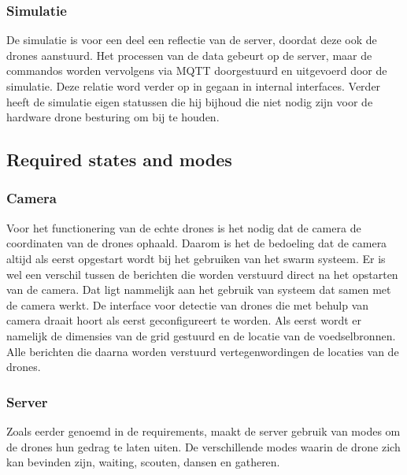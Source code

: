 \subsubsection*{Simulatie}
De simulatie is voor een deel een reflectie van de server, doordat deze ook de drones aanstuurd. Het processen van de data gebeurt op de server,
maar de commandos worden vervolgens via MQTT doorgestuurd en uitgevoerd door de simulatie. Deze relatie word verder op in gegaan in internal interfaces.
Verder heeft de simulatie eigen statussen die hij bijhoud die niet nodig zijn voor de hardware drone besturing om bij te houden. 
 



\subsection{Required states and modes}

\subsubsection*{Camera}
Voor het functionering van de echte drones is het nodig dat de camera de coordinaten van de drones ophaald. Daarom is het
de bedoeling dat de camera altijd als eerst opgestart wordt bij het gebruiken van het swarm systeem.
Er is wel een verschil tussen de berichten die worden verstuurd direct na het opstarten van de camera.
Dat ligt nammelijk aan het gebruik van systeem dat samen met de camera werkt.
De interface voor detectie van drones die met behulp van camera draait hoort als eerst geconfigureert te worden.
Als eerst wordt er namelijk de dimensies van de grid gestuurd en de locatie van de voedselbronnen. 
Alle berichten die daarna worden verstuurd vertegenwordingen de locaties van de drones.

\subsubsection*{Server}
Zoals eerder genoemd in de requirements, maakt de server gebruik van modes om de drones hun gedrag te laten uiten.
De verschillende modes waarin de drone zich kan bevinden zijn, waiting, scouten, dansen en gatheren. 

